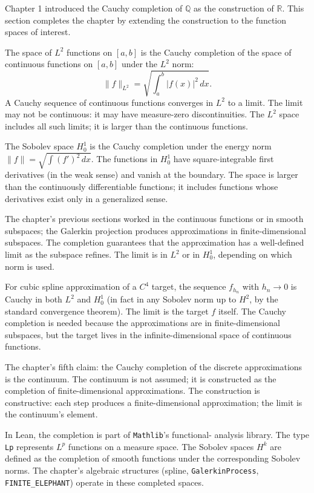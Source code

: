 Chapter 1 introduced the Cauchy completion of $\mathbb{Q}$ as the
construction of $\mathbb{R}$. This section completes the chapter by
extending the construction to the function spaces of interest.

The space of $L^2$ functions on $[a, b]$ is the Cauchy completion of
the space of continuous functions on $[a, b]$ under the $L^2$ norm:
\[
\|f\|_{L^2} = \sqrt{\int_a^b |f(x)|^2 \, dx}.
\]
A Cauchy sequence of continuous functions converges in $L^2$ to a
limit. The limit may not be continuous: it may have measure-zero
discontinuities. The $L^2$ space includes all such limits; it is
larger than the continuous functions.

The Sobolev space $H^1_0$ is the Cauchy completion under the energy
norm $\|f\| = \sqrt{\int (f')^2 \, dx}$. The functions in $H^1_0$ have
square-integrable first derivatives (in the weak sense) and vanish at
the boundary. The space is larger than the continuously
differentiable functions; it includes functions whose derivatives
exist only in a generalized sense.

The chapter's previous sections worked in the continuous functions or
in smooth subspaces; the Galerkin projection produces approximations
in finite-dimensional subspaces. The completion guarantees that the
approximation has a well-defined limit as the subspace refines. The
limit is in $L^2$ or in $H^1_0$, depending on which norm is used.

For cubic spline approximation of a $C^4$ target, the sequence
$f_{h_n}$ with $h_n \to 0$ is Cauchy in both $L^2$ and $H^1_0$ (in
fact in any Sobolev norm up to $H^2$, by the standard convergence
theorem). The limit is the target $f$ itself. The Cauchy completion
is needed because the approximations are in finite-dimensional
subspaces, but the target lives in the infinite-dimensional space
of continuous functions.

The chapter's fifth claim: the Cauchy completion of the discrete
approximations is the continuum. The continuum is not assumed; it
is constructed as the completion of finite-dimensional
approximations. The construction is constructive: each step
produces a finite-dimensional approximation; the limit is the
continuum's element.

In Lean, the completion is part of \texttt{Mathlib}'s functional-
analysis library. The type \texttt{Lp} represents $L^p$ functions
on a measure space. The Sobolev spaces $H^k$ are defined as the
completion of smooth functions under the corresponding Sobolev
norms. The chapter's algebraic structures (spline,
\texttt{GalerkinProcess}, \texttt{FINITE\_ELEPHANT}) operate in
these completed spaces.

